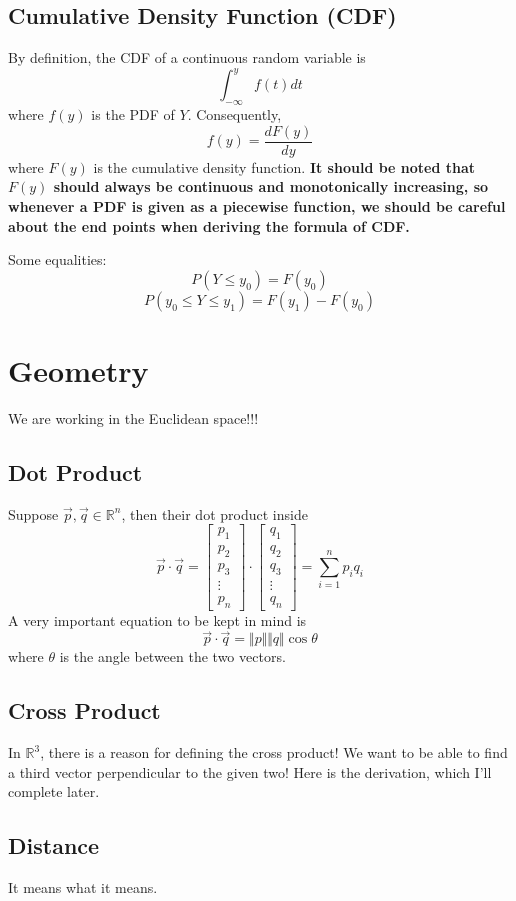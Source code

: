 \documentclass{article}
\theoremstyle{definition}
\theoremstyle{definition}
\theoremstyle{definition}
\theoremstyle{definition}
\theoremstyle{definition}
\theoremstyle{definition}
\theoremstyle{definition}
\theoremstyle{definition}
\theoremstyle{definition}
\newcommand{\RR}{\mathbb{R}}
\begin{document}
\subsection{Cumulative Density Function (CDF)}
By definition, the CDF of a continuous random variable is
\[
\int_{-\infty}^yf(t)dt    
\]
where $f(y)$ is the PDF of $Y$. Consequently, 
\[f(y)=\dfrac{dF(y)}{dy}\]
where $F(y)$ is the cumulative density function.
\textbf{It should be noted that $F(y)$ should always be continuous and monotonically increasing, so whenever a PDF is given as a piecewise function, we should be careful about the end points when deriving the formula of CDF.}

Some equalities:
\[P(Y\le y_0)=F(y_0)\]
\[P(y_0\le Y\le y_1)=F(y_1)-F(y_0)\]

\section{Geometry}
We are working in the Euclidean space!!!
\subsection{Dot Product}
Suppose $\vec{p},\vec{q}\in\RR^n$, then their dot product inside
\[
\vec{p}\cdot\vec{q}=\begin{bmatrix}
    p_1\\p_2\\p_3\\ \vdots\\p_n
\end{bmatrix}\cdot\begin{bmatrix}
    q_1\\q_2\\q_3\\ \vdots\\q_n
\end{bmatrix}  
=\sum_{i=1}^n p_iq_i 
\]
A very important equation to be kept in mind is 
\[\vec{p}\cdot\vec{q}=\Vert p\Vert\Vert q\Vert\cos\theta\]
where $\theta$ is the angle between the two vectors.
\subsection{Cross Product}
In $\RR^3$, there is a reason for defining the cross product! We want to be able to find a third vector perpendicular to the given two! Here is the derivation, which I'll complete later.
\subsection{Distance}
It means what it means.
\end{document}
